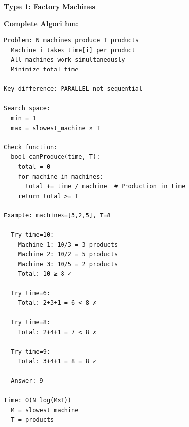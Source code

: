 \documentclass[11pt,a4paper,oneside]{book}
\begin{document}
\begin{tcolorbox}[
    enhanced,breakable,
    colback=lightgray,
    colframe=accentorange,
    boxrule=2pt,
    arc=4mm,
    title=\textbf{Complete Parallel Production Algorithms}
]
\textbf{Type 1: Factory Machines}

\textbf{Complete Algorithm:}
\begin{verbatim}
Problem: N machines produce T products
  Machine i takes time[i] per product
  All machines work simultaneously
  Minimize total time

Key difference: PARALLEL not sequential

Search space:
  min = 1
  max = slowest_machine × T

Check function:
  bool canProduce(time, T):
    total = 0
    for machine in machines:
      total += time / machine  # Production in time
    return total >= T

Example: machines=[3,2,5], T=8
  
  Try time=10:
    Machine 1: 10/3 = 3 products
    Machine 2: 10/2 = 5 products
    Machine 3: 10/5 = 2 products
    Total: 10 ≥ 8 ✓
  
  Try time=6:
    Total: 2+3+1 = 6 < 8 ✗
  
  Try time=8:
    Total: 2+4+1 = 7 < 8 ✗
  
  Try time=9:
    Total: 3+4+1 = 8 = 8 ✓
  
  Answer: 9

Time: O(N log(M×T))
  M = slowest machine
  T = products
\end{verbatim}
\end{tcolorbox}
\end{document}

